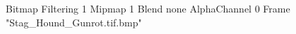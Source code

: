 {Bitmap
	{Filtering 1}
	{Mipmap 1}
	{Blend none}
	{AlphaChannel 0}
	{Frame "Stag_Hound_Gunrot.tif.bmp"}
}

